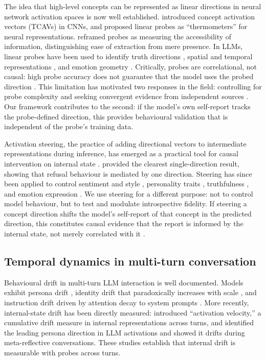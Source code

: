 \documentclass[10pt]{article}
\begin{document}
The idea that high-level concepts can be represented as linear directions in neural network activation spaces is now well established. \citet{Kim2018} introduced concept activation vectors (TCAVs) in CNNs, and \citet{AlainBengio2018} proposed linear probes as ``thermometers'' for neural representations. \citet{Pimentel2020} reframed probes as measuring the accessibility of information, distinguishing ease of extraction from mere presence. In LLMs, linear probes have been used to identify truth directions \citep{Burns2022, AzariaMitchell2023}, spatial and temporal representations \citep{GurneeTegmark2023}, and emotion geometry \citep{ZhangZhong2025}. Critically, probes are correlational, not causal: high probe accuracy does not guarantee that the model uses the probed direction \citep{Belinkov2022, HewittLiang2019}. This limitation has motivated two responses in the field: controlling for probe complexity \citep{HewittLiang2019} and seeking convergent evidence from independent sources \citep{Belinkov2022}. Our framework contributes to the second: if the model's own self-report tracks the probe-defined direction, this provides behavioural validation that is independent of the probe's training data.

Activation steering, the practice of adding directional vectors to intermediate representations during inference, has emerged as a practical tool for causal intervention on internal state \citep{Turner2024, Panickssery2023, Zou2023, Li2023}. \citet{Arditi2024} provided the clearest single-direction result, showing that refusal behaviour is mediated by one direction. Steering has since been applied to control sentiment and style \citep{Konen2024}, personality traits \citep{FrisingBalcells2025}, truthfulness \citep{Li2023}, and emotion expression \citep{WangEmotion2025}. We use steering for a different purpose: not to control model behaviour, but to test and modulate introspective fidelity. If steering a concept direction shifts the model's self-report of that concept in the predicted direction, this constitutes causal evidence that the report is informed by the internal state, not merely correlated with it \citep{JiAn2025, FrisingBalcells2025}.

\subsection{Temporal dynamics in multi-turn conversation}
\label{sec:rw-temporal}

Behavioural drift in multi-turn LLM interaction is well documented. Models exhibit persona drift \citep{Kim2020, Abdulhai2025}, identity drift that paradoxically increases with scale \citep{Choi2024}, and instruction drift driven by attention decay to system prompts \citep{LiInstruction2024}. More recently, internal-state drift has been directly measured: \citet{Das2026} introduced ``activation velocity,'' a cumulative drift measure in internal representations across turns, and \citet{Lu2026} identified the leading persona direction in LLM activations and showed it drifts during meta-reflective conversations. These studies establish that internal drift is measurable with probes across turns.
\end{document}
